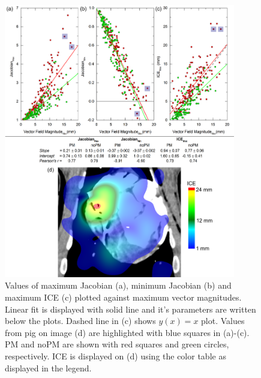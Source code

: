 
\begin{figure}[H]
	\begin{center}		
		\includegraphics[width=0.9\textwidth]{./Vmm/Images/MaxVfdata_pigs.png}
		\caption{Values of maximum Jacobian (a), minimum Jacobian (b) and maximum ICE (c) plotted against maximum vector magnitudes. Linear fit is displayed with solid line and it's parameters are written below the plots. Dashed line in (c) shows $y(x)= x$ plot. Values from pig on image (d) are highlighted with blue squares in (a)-(c). PM and noPM are shown with red squares and green circles, respectively.
			ICE is displayed on (d) using the color table as displayed in the legend.}
		\label{maxvf_pigs}
	\end{center}
\end{figure}

